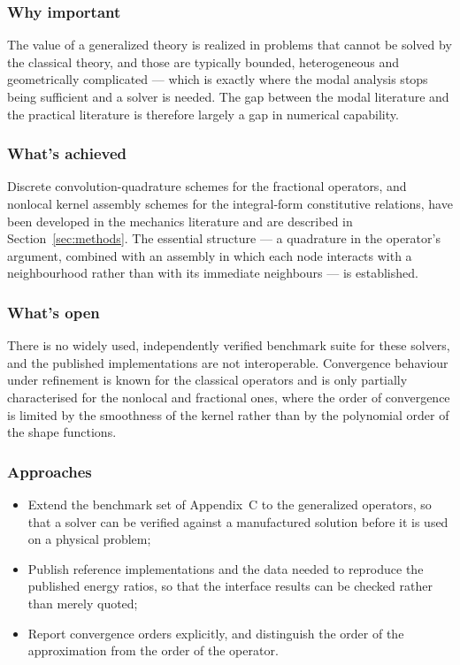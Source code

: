 \subsubsection{Why important}

The value of a generalized theory is realized in problems that cannot be solved by the classical theory, and those are typically bounded, heterogeneous and geometrically complicated --- which is exactly where the modal analysis stops being sufficient and a solver is needed. The gap between the modal literature and the practical literature is therefore largely a gap in numerical capability.

\subsubsection{What's achieved}

Discrete convolution-quadrature schemes for the fractional operators, and nonlocal kernel assembly schemes for the integral-form constitutive relations, have been developed in the mechanics literature and are described in Section~\ref{sec:methods}. The essential structure --- a quadrature in the operator's argument, combined with an assembly in which each node interacts with a neighbourhood rather than with its immediate neighbours --- is established.

\subsubsection{What's open}

There is no widely used, independently verified benchmark suite for these solvers, and the published implementations are not interoperable. Convergence behaviour under refinement is known for the classical operators and is only partially characterised for the nonlocal and fractional ones, where the order of convergence is limited by the smoothness of the kernel rather than by the polynomial order of the shape functions.

\subsubsection{Approaches}

\begin{itemize}
\item Extend the benchmark set of Appendix~C to the generalized operators, so that a solver can be verified against a manufactured solution before it is used on a physical problem;
\item Publish reference implementations and the data needed to reproduce the published energy ratios, so that the interface results can be checked rather than merely quoted;
\item Report convergence orders explicitly, and distinguish the order of the approximation from the order of the operator.
\end{itemize}

